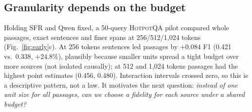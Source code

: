 \documentclass[10pt,twocolumn,letterpaper]{article}
\newcommand{\hotpot}{\textsc{HotpotQA}\xspace}
\begin{document}
\subsection{Granularity depends on the budget}
Holding SFR and Qwen fixed, a 50-query \hotpot pilot compared whole passages, exact sentences and finer spans at 256/512/1,024 tokens (Fig.~\ref{fig:early}c). At 256 tokens sentences led passages by $+0.084$ F1 (0.421 vs.\ 0.338, $+24.8\%$), plausibly because smaller units spread a tight budget over more sources (not isolated causally); at 512 and 1,024 tokens passages had the highest point estimates (0.456, 0.480). Interaction intervals crossed zero, so this is a descriptive pattern, not a law. It motivates the next question: \emph{instead of one unit size for all passages, can we choose a fidelity for each source under a shared budget?}
\end{document}
